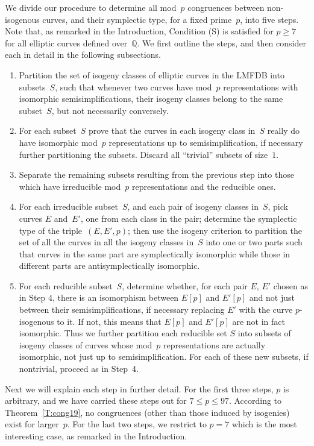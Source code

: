 \documentclass[twoside,leqno,symbols-for-thanks, draft]{rmi}
\numberwithin{equation}{section}
\newcommand{\Q}{\mathbb{Q}}
\theoremstyle{remark}
\begin{document}
We divide our procedure to determine all mod~$p$ congruences between
non-isogenous curves, and their symplectic type, for a fixed
prime~$p$, into five steps.  Note that, as remarked in the
Introduction, Condition (S) is satisfied for $p\ge7$ for all elliptic
curves defined over~$\Q$.  We first outline the steps, and then
consider each in detail in the following subsections.
\begin{enumerate}[1.]
\item Partition the set of isogeny classes of elliptic curves in the LMFDB
  into subsets~$S$, such that whenever two curves have mod~$p$
  representations with isomorphic semisimplifications, their isogeny
  classes belong to the same subset~$S$, but not necessarily
  conversely.
\item For each subset~$S$ prove that the curves in each isogeny class in~$S$ really
  do have isomorphic mod~$p$ representations up to
  semisimplification, if necessary further partitioning the subsets.
  Discard all ``trivial'' subsets of size~$1$.
\item Separate the remaining subsets resulting from the previous
  step into those which have irreducible mod~$p$ representations and
  the reducible ones.
\item For each irreducible subset~$S$, and each pair of isogeny
  classes in~$S$, pick curves $E$ and~$E'$, one from each class in the
  pair; determine the symplectic type of the triple~$(E,E',p)$; then
  use the isogeny criterion to partition the set of all the curves in
  all the isogeny classes in~$S$ into one or two parts such that curves
  in the same part are symplectically isomorphic while those in
  different parts are antisymplectically isomorphic.
\item For each reducible subset~$S$, determine whether, for each pair
  $E$, $E'$ chosen as in Step 4, there is an isomorphism between
  $E[p]$ and $E'[p]$ and not just between their semisimplifications,
  if necessary replacing $E'$ with the curve $p$-isogenous to it.  If
  not, this means that $E[p]$ and $E'[p]$ are not in fact isomorphic.
  Thus we further partition each reducible set $S$ into subsets of
  isogeny classes of curves whose mod~$p$ representations are actually
  isomorphic, not just up to semisimplification.  For each of these
  new subsets, if nontrivial, proceed as in Step~4.

\end{enumerate}
Next we will explain each step in further detail.  For the first three
steps, $p$ is arbitrary, and we have carried these steps out for $7\le
p\le97$.  According to Theorem~\ref{T:cong19}, no congruences
(other than those induced by isogenies) exist for larger~$p$.  For the
last two steps, we restrict to $p=7$ which is the most interesting
case, as remarked in the Introduction.
\end{document}
